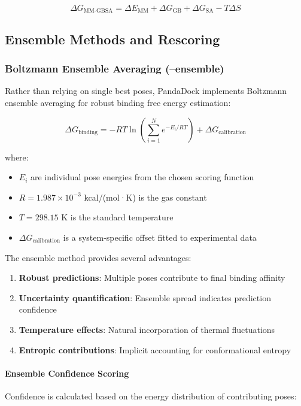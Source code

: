 \documentclass[11pt,a4paper]{article}
\begin{document}
\begin{equation}
\Delta G_{\text{MM-GBSA}} = \Delta E_{\text{MM}} + \Delta G_{\text{GB}} + \Delta G_{\text{SA}} - T\Delta S
\end{equation}

\subsection{Ensemble Methods and Rescoring}

\subsubsection{Boltzmann Ensemble Averaging (--ensemble)}

Rather than relying on single best poses, PandaDock implements Boltzmann ensemble averaging for robust binding free energy estimation:

\begin{equation}
\Delta G_{\text{binding}} = -RT \ln\left(\sum_{i=1}^{N} e^{-E_i/RT}\right) + \Delta G_{\text{calibration}}
\end{equation}

where:
\begin{itemize}
\item $E_i$ are individual pose energies from the chosen scoring function
\item $R = 1.987 \times 10^{-3}$ kcal/(mol·K) is the gas constant
\item $T = 298.15$ K is the standard temperature
\item $\Delta G_{\text{calibration}}$ is a system-specific offset fitted to experimental data
\end{itemize}

The ensemble method provides several advantages:
\begin{enumerate}
\item \textbf{Robust predictions}: Multiple poses contribute to final binding affinity
\item \textbf{Uncertainty quantification}: Ensemble spread indicates prediction confidence
\item \textbf{Temperature effects}: Natural incorporation of thermal fluctuations
\item \textbf{Entropic contributions}: Implicit accounting for conformational entropy
\end{enumerate}

\paragraph{Ensemble Confidence Scoring}
Confidence is calculated based on the energy distribution of contributing poses:
\end{document}
